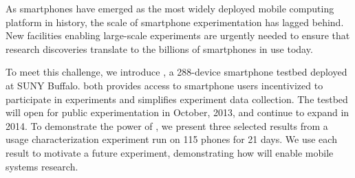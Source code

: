 As smartphones have emerged as the most widely deployed mobile computing
platform in history, the scale of smartphone experimentation has lagged
behind. New facilities enabling large-scale experiments are urgently needed
to ensure that research discoveries translate to the billions of smartphones
in use today.

To meet this challenge, we introduce \PhoneLab{}, a 288-device smartphone
testbed deployed at SUNY Buffalo. \PhoneLab{} both provides access to
smartphone users incentivized to participate in experiments and simplifies
experiment data collection. The testbed will open for public experimentation
in October, 2013, and continue to expand in 2014. To demonstrate the power of
\PhoneLab{}, we present three selected results from a usage characterization
experiment run on 115 phones for 21 days. We use each result to motivate a
future \PhoneLab{} experiment, demonstrating how \PhoneLab{} will enable
mobile systems research.
